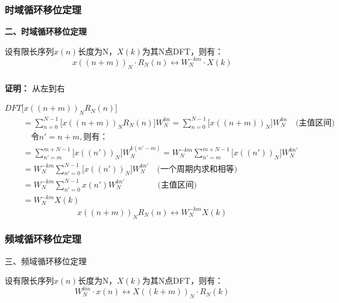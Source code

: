 \documentclass[notheorems,compress,mathserif,table]{beamer}
\begin{document}
\begin{frame}[shrink]\frametitle{时域循环移位定理}%
\textbf{二、时域循环移位定理}

设有限长序列$x(n)$长度为N，$X(k)$为其N点DFT，则有：
$$x((n+m))_N\cdot R_N(n) \longleftrightarrow W_N^{-km}\cdot X(k)$$

\end{frame}

\begin{frame}[shrink]\frametitle{}%
\textbf{证明：}  从左到右

$DFT\bigg[ x((n+m))_N R_N(n)\bigg]$
\begin{equation*}
\begin{split}
    \quad
         &= \sum_{n=0}^{N-1}\bigg[x((n+m))_N R_N(n)\bigg]W_N^{kn}
          = \sum_{n=0}^{N-1}\bigg[x((n+m))_N\bigg]W_N^{kn} \quad\mbox{(主值区间)}\quad\\
         &\quad  \mbox{令} n' =n+m,\mbox{则有：}  \\
         &= \sum_{n'=m}^{m+N-1}\bigg[x((n'))_N\bigg]W_N^{k(n'-m)}
          = W_N^{-km}\sum_{n'=m}^{m+N-1}\bigg[x((n'))_N\bigg]W_N^{kn'}\\
         &= W_N^{-km}\sum_{n'=0}^{N-1}\bigg[x((n'))_N\bigg]W_N^{kn'}\quad\mbox{(一个周期内求和相等)}\\
         &= W_N^{-km}\sum_{n'=0}^{N-1}x(n')W_N^{kn'}  \quad\quad\quad\quad\mbox{(主值区间)}\\
         &= W_N^{-km}X(k)
\end{split}
\end{equation*}
$$x((n+m))_N R_N(n) \longleftrightarrow W_N^{-km}X(k)$$

\end{frame}



\begin{frame}[shrink]\frametitle{频域循环移位定理}%
三、频域循环移位定理

设有限长序列$x(n)$长度为N，$X(k)$为其N点DFT，则有：
$$W_N^{km}\cdot x(n) \longleftrightarrow X((k+m))_N\cdot R_N(k)$$


\end{frame}
\end{document}
